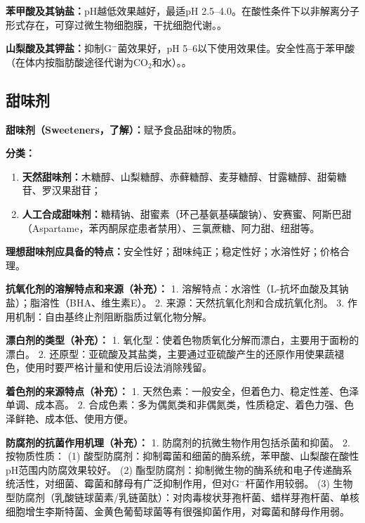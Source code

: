 \begin{tipbox}
\textbf{苯甲酸及其钠盐：}pH越低效果越好，最适pH 2.5--4.0。在酸性条件下以非解离分子形式存在，可穿过微生物细胞膜，干扰细胞代谢。。

\textbf{山梨酸及其钾盐：}抑制G$^-$菌效果好，pH 5--6以下使用效果佳。安全性高于苯甲酸（在体内按脂肪酸途径代谢为CO$_2$和水）。。
\end{tipbox}

\subsection{甜味剂}

\begin{tipbox}
\textbf{甜味剂（Sweeteners，了解）：}赋予食品甜味的物质。

\textbf{分类：}
\begin{enumerate}[leftmargin=*]
    \item \textbf{天然甜味剂：}木糖醇、山梨糖醇、赤藓糖醇、麦芽糖醇、甘露糖醇、甜菊糖苷、罗汉果甜苷；
    \item \textbf{人工合成甜味剂：}糖精钠、甜蜜素（环己基氨基磺酸钠）、安赛蜜、阿斯巴甜（Aspartame，苯丙酮尿症患者禁用）、三氯蔗糖、阿力甜、纽甜等。
\end{enumerate}

\textbf{理想甜味剂应具备的特点：}安全性好；甜味纯正；稳定性好；水溶性好；价格合理。
\end{tipbox}

\begin{tipbox}
\textbf{抗氧化剂的溶解特点和来源（补充）：}
1. 溶解特点：水溶性（L-抗坏血酸及其钠盐）；脂溶性（BHA、维生素E）。
2. 来源：天然抗氧化剂和合成抗氧化剂。
3. 作用机制：自由基终止剂阻断脂质过氧化物分解。

\textbf{漂白剂的类型（补充）：}
1. 氧化型：使着色物质氧化分解而漂白，主要用于面粉的漂白。
2. 还原型：亚硫酸及其盐类，主要通过亚硫酸产生的还原作用使果蔬褪色，使用时要严格计量和使用后设法消除残留。

\textbf{着色剂的来源特点（补充）：}
1. 天然色素：一般安全，但着色力、稳定性差、色泽单调、成本高。
2. 合成色素：多为偶氮类和非偶氮类，性质稳定、着色力强、色泽鲜艳、成本低、使用方便。
\end{tipbox}

\begin{tipbox}
\textbf{防腐剂的抗菌作用机理（补充）：}
1. 防腐剂的抗微生物作用包括杀菌和抑菌。
2. 按物质性质：
   (1) 酸型防腐剂：抑制霉菌和细菌的酶系统，苯甲酸、山梨酸在酸性pH范围内防腐效果较好。
   (2) 酯型防腐剂：抑制微生物的酶系统和电子传递酶系统活性，对细菌、霉菌和酵母有广泛抑制作用，但对G$^-$杆菌作用较弱。
   (3) 生物型防腐剂（乳酸链球菌素/乳链菌肽）：对肉毒梭状芽孢杆菌、蜡样芽孢杆菌、单核细胞增生李斯特菌、金黄色葡萄球菌等有很强抑菌作用，对霉菌和酵母作用弱。
\end{tipbox}

